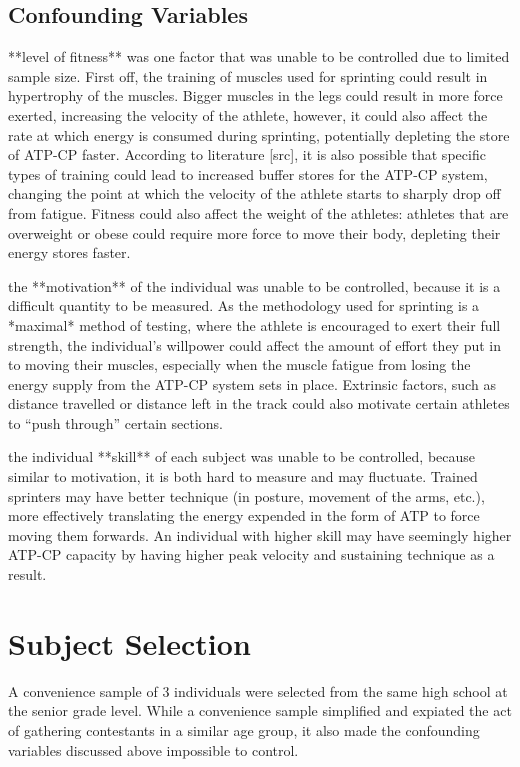 \documentclass[index]{subfiles}
\begin{document}
\subsection{Confounding Variables}

**level of fitness** was one factor that was unable to be controlled due to limited sample size. First off, the training of muscles used for sprinting could result in hypertrophy of the muscles. Bigger muscles in the legs could result in more force exerted, increasing the velocity of the athlete, however, it could also affect the rate at which energy is consumed during sprinting, potentially depleting the store of ATP-CP faster. According to literature [src], it is also possible that specific types of training could lead to increased buffer stores for the ATP-CP system, changing the point at which the velocity of the athlete starts to sharply drop off from fatigue. Fitness could also affect the weight of the athletes: athletes that are overweight or obese could require more force to move their body, depleting their energy stores faster.

the **motivation** of the individual was unable to be controlled, because it is a difficult quantity to be measured. As the methodology used for sprinting is a *maximal* method of testing, where the athlete is encouraged to exert their full strength, the individual's willpower could affect the amount of effort they put in to moving their muscles, especially when the muscle fatigue from losing the energy supply from the ATP-CP system sets in place. Extrinsic factors, such as distance travelled or distance left in the track could also motivate certain athletes to ``push through'' certain sections.

the individual **skill** of each subject was unable to be controlled, because similar to motivation, it is both hard to measure and may fluctuate. Trained sprinters may have better technique (in posture, movement of the arms, etc.), more effectively translating the energy expended in the form of ATP to force moving them forwards. An individual with higher skill may have seemingly higher ATP-CP capacity by having higher peak velocity and sustaining technique as a result.

\section{Subject Selection}
A convenience sample of 3 individuals were selected from the same high school at the senior grade level. While a convenience sample simplified and expiated the act of gathering contestants in a similar age group, it also made the confounding variables discussed above impossible to control.
\end{document}
